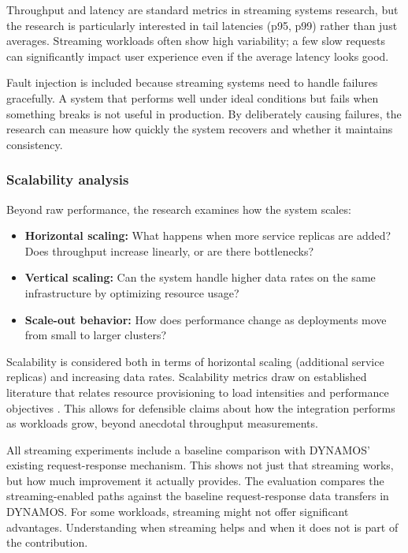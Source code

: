 \documentclass[a4paper,10pt,british]{scrartcl}
\begin{document}
Throughput and latency are standard metrics in streaming systems research, but the research is particularly interested in tail latencies (p95, p99) rather than just averages. Streaming workloads often show high variability; a few slow requests can significantly impact user experience even if the average latency looks good.

Fault injection is included because streaming systems need to handle failures gracefully. A system that performs well under ideal conditions but fails when something breaks is not useful in production. By deliberately causing failures, the research can measure how quickly the system recovers and whether it maintains consistency.

\subsubsection{Scalability analysis}

Beyond raw performance, the research examines how the system scales:

\begin{itemize}
  \item \textbf{Horizontal scaling:} What happens when more service replicas are added? Does throughput increase linearly, or are there bottlenecks?
  \item \textbf{Vertical scaling:} Can the system handle higher data rates on the same infrastructure by optimizing resource usage?
  \item \textbf{Scale-out behavior:} How does performance change as deployments move from small to larger clusters?
\end{itemize}

Scalability is considered both in terms of horizontal scaling (additional service replicas) and increasing data rates. Scalability metrics draw on established literature that relates resource provisioning to load intensities and performance objectives \cite{Henning2021ScalabilityMetrics}. This allows for defensible claims about how the integration performs as workloads grow, beyond anecdotal throughput measurements.

\pargraph{}

All streaming experiments include a baseline comparison with DYNAMOS' existing request-response mechanism. This shows not just that streaming works, but how much improvement it actually provides. The evaluation compares the streaming-enabled paths against the baseline request-response data transfers in DYNAMOS. For some workloads, streaming might not offer significant advantages. Understanding when streaming helps and when it does not is part of the contribution.
\end{document}
